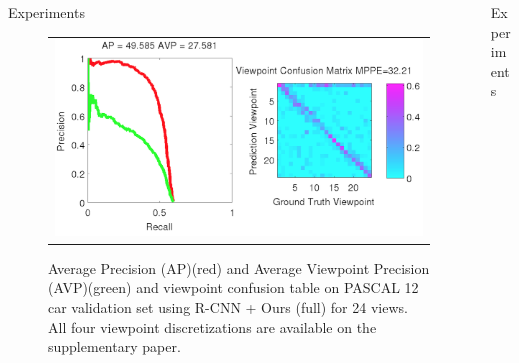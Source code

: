 \documentclass[serif,mathserif,final]{beamer}
\newcommand{\1}{\mathbb{I}} %
\begin{document}
\begin{frame}{}
\begin{columns}[t]
\begin{column}{0.23\linewidth}
\begin{block}{Experiments}
        \begin{figure}
          \setlength\tabcolsep{1pt}
          \centering
          \begin{tabular}{c}
            \includegraphics[width=0.6\linewidth]{car_cnn24_crop.png} \\   
          \end{tabular}
          \caption{\small Average Precision (AP)(red) and Average Viewpoint Precision (AVP)(green)
            and viewpoint confusion table on PASCAL 12 car validation set using
            R-CNN + Ours (full) for 24 views. All four viewpoint discretizations are available on the supplementary paper.}
          \label{fig:car_cnn_ap}
        \end{figure}
        \vspace{-1.0em}
      \end{block}
    \end{column}%


    \begin{column}{0.23\linewidth}
      \begin{block}{Experiments}


\end{block}
\end{column}
\end{columns}
\end{frame}
\end{document}

